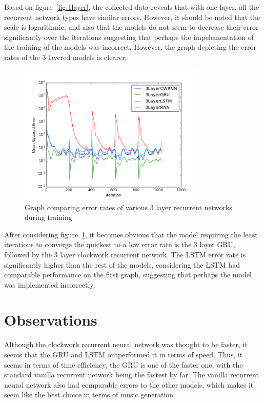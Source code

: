 \documentclass[12pt]{article}
\begin{document}
Based on figure~\ref{fig:1layer}, the collected data reveals that with one
layer, all the recurrent network types have similar errors. However, it should
be noted that the scale is logarithmic, and also that the models do not seem to
decrease their error significantly over the iterations suggesting that perhaps
the impelementation of the training of the models was incorrect. However, the
graph depicting the error rates of the 3 layered models is clearer.

\begin{figure}[H]
	\includegraphics[width=0.8\textwidth]{3LayerComparison.png}
	\caption{Graph comparing error rates of various 3 layer recurrent networks
	during training}
	\label{fig:3layer}
\end{figure}

After considering figure~\ref{fig:3layer}, it becomes obvious that the model
requiring the least iterations to converge the quickest to a low error rate is
the 3 layer GRU, followed by the 3 layer clockwork recurrent network. The LSTM
error rate is significantly higher than the rest of the models, considering the
LSTM had comparable performance on the first graph, suggesting that
perhaps the model was implemented incorrectly.

\section{Observations}
Although the clockwork recurrent neural network was thought to be faster, it
seems that the GRU and LSTM outperformed it in terms of speed. Thus, it seems in
terms of time efficiency, the GRU is one of the faster one, with the standard
vanilla recurrent network being the fastest by far. The vanilla recurrent neural
network also had comparable errors to the other models, which makes it seem like
the best choice in terms of music generation.
\end{document}
